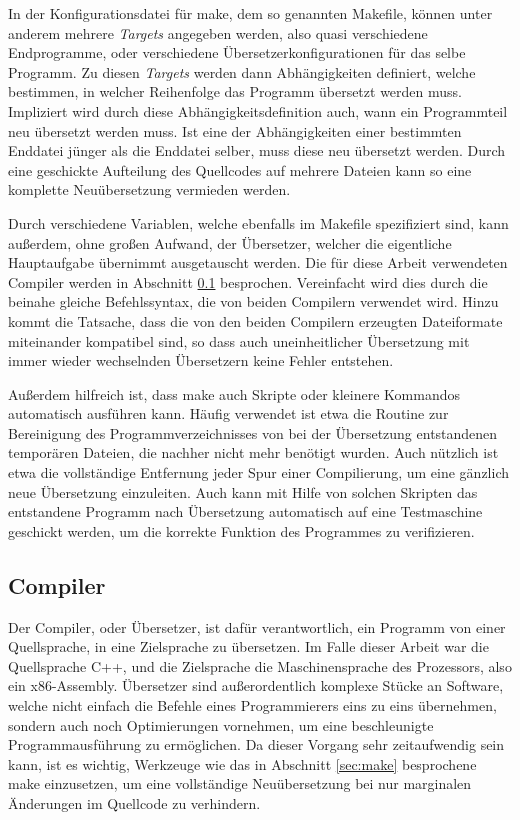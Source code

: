 In der Konfigurationsdatei für make, dem so genannten Makefile, können unter anderem mehrere \textit{Targets} angegeben werden, also quasi verschiedene Endprogramme, oder verschiedene
Übersetzerkonfigurationen für das selbe Programm. Zu diesen \textit{Targets} werden dann Ab\-hängig\-keiten definiert, welche bestimmen, in welcher Reihenfolge das Programm übersetzt werden 
muss. Impliziert wird durch diese Abhängigkeitsdefinition auch, wann ein Programmteil neu übersetzt werden muss. Ist eine der Abhängigkeiten einer bestimmten Enddatei jünger als die 
Enddatei selber, muss diese neu übersetzt werden. Durch eine geschickte Aufteilung des Quellcodes auf mehrere Dateien kann so eine komplette Neuübersetzung vermieden werden. 

Durch verschiedene Variablen, welche ebenfalls im Makefile spezifiziert sind, kann außerdem, ohne großen Aufwand, der Übersetzer, welcher die eigentliche Hauptaufgabe übernimmt ausgetauscht werden.
Die für diese Arbeit verwendeten Compiler werden in Abschnitt \ref{sec:compiler} besprochen. Vereinfacht wird dies durch die beinahe gleiche Befehlssyntax, die von beiden Compilern verwendet wird.
Hinzu kommt die Tatsache, dass die von den beiden Compilern erzeugten Dateiformate miteinander kompatibel sind, so dass auch uneinheitlicher Übersetzung mit immer wieder wechselnden Übersetzern
keine Fehler entstehen.

Außerdem hilfreich ist, dass make auch Skripte oder kleinere Kommandos automatisch aus\-füh\-ren kann. Häufig verwendet ist etwa die Routine zur Bereinigung des Programmverzeichnisses von bei der
Übersetzung entstandenen temporären Dateien, die nachher nicht mehr benötigt wurden. Auch nützlich ist etwa die vollständige Entfernung jeder Spur einer Compilierung, um eine gänzlich neue
Übersetzung einzuleiten. Auch kann mit Hilfe von solchen Skripten das entstandene Programm nach Übersetzung automatisch auf eine Testmaschine geschickt werden, um die korrekte Funktion
des Programmes zu verifizieren.

\subsection{Compiler}
\label{sec:compiler}
Der Compiler, oder Übersetzer, ist dafür verantwortlich, ein Programm von einer Quellsprache, in eine Zielsprache zu übersetzen. Im Falle dieser Arbeit war die Quellsprache C++, und die
Zielsprache die Maschinensprache des Prozessors, also ein x86-Assembly. Übersetzer sind außerordentlich komplexe Stücke an Software, welche nicht einfach die Befehle eines Programmierers eins zu
eins übernehmen, sondern auch noch Optimierungen vornehmen, um eine beschleunigte Programmausführung zu ermöglichen. Da dieser Vorgang sehr zeitaufwendig sein kann, ist es wichtig, Werkzeuge wie
das in Abschnitt \ref{sec:make} besprochene make einzusetzen, um eine vollständige Neuübersetzung bei nur marginalen Änderungen im Quellcode zu verhindern. 

